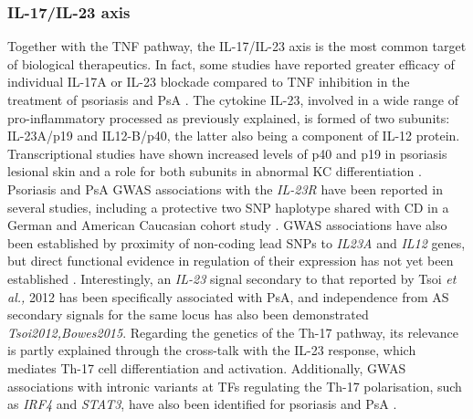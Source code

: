\subsubsection*{IL-17/IL-23 axis}
Together with the TNF pathway, the IL-17/IL-23 axis is the most common target of biological therapeutics. In fact, some studies have reported greater efficacy of individual IL-17A or IL-23 blockade compared to TNF inhibition in the treatment of psoriasis and PsA \parencite{Griffiths2015,Blauvelt2017}. 
The cytokine IL-23, involved in a wide range of pro-inflammatory processed as previously explained, is formed of two subunits: IL-23A/p19 and IL12-B/p40, the latter also being a component of IL-12 protein. Transcriptional studies have shown increased levels of p40 and p19 in psoriasis lesional skin and a role for both subunits in abnormal KC differentiation \parencite{Lee2004,Zhu2011}. Psoriasis and PsA GWAS associations with the \textit{IL-23R} have been reported in several studies, including a protective two SNP haplotype shared with CD in a German and American Caucasian cohort study \parencite{Nair2008, Strange2010, Tsoi2012}. GWAS associations have also been established by proximity of non-coding lead SNPs to \textit{IL23A} and \textit{IL12} genes, but direct functional evidence in regulation of their expression has not yet been established \parencite{Cargill2007,Strange2010,Tsoi2012}.
Interestingly, an \textit{IL-23} signal secondary to that reported by Tsoi \textit{et al.,} 2012 has been specifically associated with PsA, and independence from AS secondary signals for the same locus has also been demonstrated \textit{Tsoi2012,Bowes2015}. 
Regarding the genetics of the Th-17 pathway, its relevance is partly explained through the cross-talk with the IL-23 response, which mediates Th-17 cell differentiation and activation. Additionally, GWAS associations with intronic variants at TFs regulating the Th-17 polarisation, such as \textit{IRF4} and \textit{STAT3}, have also been identified for psoriasis and PsA \parencite{ Tsoi2012,Huber2008,Harris2007}. 
